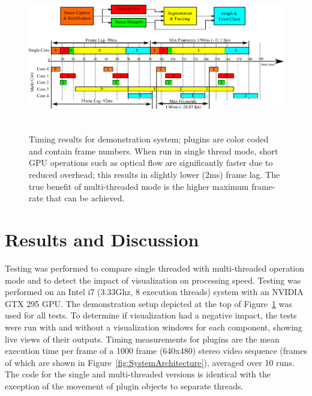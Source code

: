 \begin{figure}[t]
\begin{center}
   \includegraphics[width=0.98\linewidth,height=65mm]{TimingResults.pdf}
\end{center}
   \caption{Timing results for demonstration system; plugins are color coded and contain frame numbers. When run in single thread mode, short GPU operations such as optical flow are significantly faster due to reduced overhead; this results in slightly lower (2ms) frame lag. The true benefit of multi-threaded mode is the higher maximum frame-rate that can be achieved. }
\label{fig:TestMTST}
\end{figure}




\section{Results and Discussion}

Testing was performed to compare single threaded with multi-threaded operation mode and to detect the impact of visualization on processing speed. Testing was performed on an Intel i7 (3.33Ghz, 8 execution threads) system with an NVIDIA GTX 295 GPU. The demonstration setup depicted at the top of Figure~\ref{fig:TestMTST} was used for all tests. To determine if visualization had a negative impact, the tests were run with and without a visualization windows for each component, showing live views of their outputs. Timing measurements for plugins are the mean execution time per frame of a 1000 frame (640x480) stereo video sequence (frames of which are shown in Figure~\ref{fig:SystemArchitecture}), averaged over 10 runs. The code for the single and multi-threaded versions is identical with the exception of the movement of plugin objects to separate threads.

